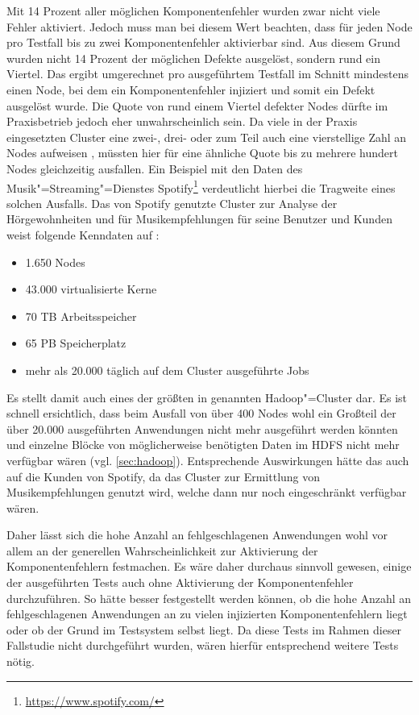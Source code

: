 Mit 14 Prozent aller möglichen Komponentenfehler wurden zwar nicht viele Fehler aktiviert.
Jedoch muss man bei diesem Wert beachten, dass für jeden Node pro Testfall bis zu zwei Komponentenfehler aktivierbar sind.
Aus diesem Grund wurden nicht 14 Prozent der möglichen Defekte ausgelöst, sondern rund ein Viertel.
Das ergibt umgerechnet pro ausgeführtem Testfall im Schnitt mindestens einen Node, bei dem ein Komponentenfehler injiziert und somit ein Defekt ausgelöst wurde.
Die Quote von rund einem Viertel defekter Nodes dürfte im Praxisbetrieb jedoch eher unwahrscheinlich sein.
Da viele in der Praxis eingesetzten Cluster eine zwei-, drei- oder zum Teil auch eine vierstellige Zahl an Nodes aufweisen \cite{PoweredByHadoop}, müssten hier für eine ähnliche Quote bis zu mehrere hundert Nodes gleichzeitig ausfallen.
Ein Beispiel mit den Daten des Musik"=Streaming"=Dienstes Spotify\footnote{\url{https://www.spotify.com/}} verdeutlicht hierbei die Tragweite eines solchen Ausfalls.
Das von Spotify genutzte Cluster zur Analyse der Hörgewohnheiten und für Musikempfehlungen für seine Benutzer und Kunden weist folgende Kenndaten auf \cite{PoweredByHadoop}:

\begin{itemize}
    \item 1.650 Nodes
    \item 43.000 virtualisierte Kerne
    \item 70 TB Arbeitsspeicher
    \item 65 PB Speicherplatz
    \item mehr als 20.000 täglich auf dem Cluster ausgeführte Jobs
\end{itemize}

Es stellt damit auch eines der größten in \cite{PoweredByHadoop} genannten Hadoop"=Cluster dar.
Es ist schnell ersichtlich, dass beim Ausfall von über 400 Nodes wohl ein Großteil der über 20.000 ausgeführten Anwendungen nicht mehr ausgeführt werden könnten und einzelne Blöcke von möglicherweise benötigten Daten im \gls{HDFS} nicht mehr verfügbar wären (vgl. \cref{sec:hadoop}).
Entsprechende Auswirkungen hätte das auch auf die Kunden von Spotify, da das Cluster \uA zur Ermittlung von Musikempfehlungen genutzt wird, welche dann nur noch eingeschränkt verfügbar wären.

Daher lässt sich die hohe Anzahl an fehlgeschlagenen Anwendungen wohl vor allem an der generellen Wahrscheinlichkeit zur Aktivierung der Komponentenfehlern festmachen.
Es wäre daher durchaus sinnvoll gewesen, einige der ausgeführten Tests auch ohne Aktivierung der Komponentenfehler durchzuführen.
So hätte besser festgestellt werden können, ob die hohe Anzahl an fehlgeschlagenen Anwendungen an zu vielen injizierten Komponentenfehlern liegt oder ob der Grund im Testsystem selbst liegt.
Da diese Tests im Rahmen dieser Fallstudie nicht durchgeführt wurden, wären hierfür entsprechend weitere Tests nötig.


